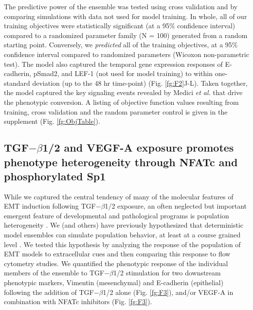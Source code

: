 \documentclass[11pt,letterpaper]{article}
\begin{document}

The predictive power of the ensemble was tested using cross validation and by comparing simulations with data not used for model training.
In whole, all of our training objectives were statistically significant (at a 95\% confidence interval) compared to a randomized parameter family (N = 100)
generated from a random starting point. Conversely, we \emph{predicted} all of the training objectives, at a 95\% confidence interval compared to randomized parameters (Wicoxon non-parametric test). The model also captured the temporal gene expression responses of E-cadherin, pSmad2, and LEF-1 (not used for model training) to within one-standard deviation (up to the 48 hr time-point) (Fig. \ref{fg:F2}J-L). Taken together, the model captured the key signaling events revealed by Medici \emph{et al.} \cite{Medici:2008fk} that drive the phenotypic conversion. A listing of objective function values resulting from training, cross validation and the random parameter control is given in the supplement (Fig. \ref{fg:ObjTable}).

\subsection*{TGF$-\beta$1/2 and VEGF-A exposure promotes phenotype heterogeneity through NFATc and phosphorylated Sp1}
While we captured the central tendency of many of the molecular features of EMT induction following TGF$-\beta$1/2 exposure, an often neglected but important emergent
feature of developmental and pathological programs is population heterogeneity \cite{Park:2010fu}.
We (and others) have previously hypothesized that deterministic model ensembles can simulate population behavior, at least at a course grained level \cite{Lequieu:2011fj}.
We tested this hypothesis by analyzing the response of the population of EMT models to extracellular cues and then comparing this response to flow cytometry studies.
We quantified the phenotypic response of the individual members of the ensemble to TGF$-\beta$1/2 stimulation for two downstream phenotypic markers, Vimentin (mesenchymal) and E-cadherin (epithelial) following the addition of TGF$-\beta$1/2 alone (Fig. \ref{fg:F3}), and/or VEGF-A in combination with NFATc inhibitors (Fig. \ref{fg:F3}).
\end{document}
